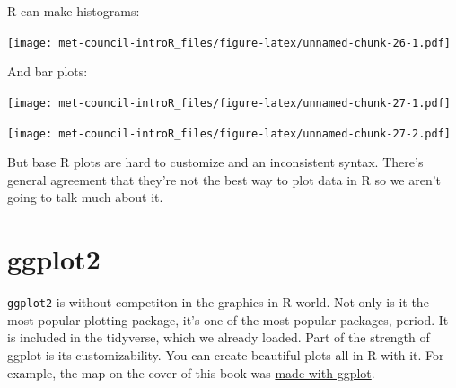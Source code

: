 \documentclass[]{book}
\newenvironment{Shaded}{\begin{snugshade}}{\end{snugshade}}
\newcommand{\KeywordTok}[1]{\textcolor[rgb]{0.13,0.29,0.53}{\textbf{#1}}}
\newcommand{\DataTypeTok}[1]{\textcolor[rgb]{0.13,0.29,0.53}{#1}}
\newcommand{\DecValTok}[1]{\textcolor[rgb]{0.00,0.00,0.81}{#1}}
\newcommand{\StringTok}[1]{\textcolor[rgb]{0.31,0.60,0.02}{#1}}
\newcommand{\CommentTok}[1]{\textcolor[rgb]{0.56,0.35,0.01}{\textit{#1}}}
\newcommand{\OperatorTok}[1]{\textcolor[rgb]{0.81,0.36,0.00}{\textbf{#1}}}
\newcommand{\NormalTok}[1]{#1}
\begin{document}
R can make histograms:

\begin{Shaded}
\end{Shaded}

\texttt{[image: met-council-introR\_files/figure-latex/unnamed-chunk-26-1.pdf]}

And bar plots:

\begin{Shaded}
\end{Shaded}

\texttt{[image: met-council-introR\_files/figure-latex/unnamed-chunk-27-1.pdf]}

\begin{Shaded}
\end{Shaded}

\texttt{[image: met-council-introR\_files/figure-latex/unnamed-chunk-27-2.pdf]}

But base R plots are hard to customize and an inconsistent syntax.
There's general agreement that they're not the best way to plot data in
R so we aren't going to talk much about it.

\section{ggplot2}\label{ggplot2}

\texttt{ggplot2} is without competiton in the graphics in R world. Not
only is it the most popular plotting package, it's one of the most
popular packages, period. It is included in the tidyverse, which we
already loaded. Part of the strength of ggplot is its customizability.
You can create beautiful plots all in R with it. For example, the map on
the cover of this book was
\href{https://timogrossenbacher.ch/2016/12/beautiful-thematic-maps-with-ggplot2-only/}{made
with ggplot}.
\end{document}
